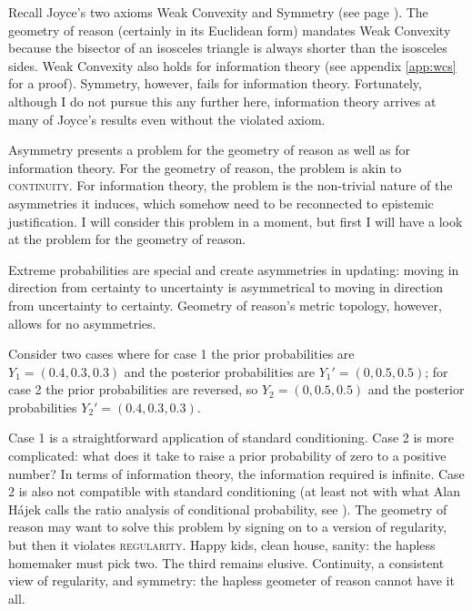 \documentclass[11pt]{article}
\begin{document}
Recall Joyce's two axioms Weak Convexity and Symmetry (see page
\pageref{quot:weakconv}). The geometry of reason (certainly in its
Euclidean form) mandates Weak Convexity because the bisector of an
isosceles triangle is always shorter than the isosceles sides. Weak
Convexity also holds for information theory (see appendix
\ref{app:wcs} for a proof). Symmetry, however, fails for information
theory. Fortunately, although I do not pursue this any further here,
information theory arrives at many of Joyce's results even without the
violated axiom.

Asymmetry presents a problem for the geometry of reason as well as for
information theory. For the geometry of reason, the problem is akin to
\textsc{continuity}. For information theory, the problem is the
non-trivial nature of the asymmetries it induces, which somehow need
to be reconnected to epistemic justification. I will consider this
problem in a moment, but first I will have a look at the problem for
the geometry of reason.

Extreme probabilities are special and create asymmetries in updating:
moving in direction from certainty to uncertainty is asymmetrical to
moving in direction from uncertainty to certainty. Geometry of
reason's metric topology, however, allows for no asymmetries.

\begin{quotex}
  \label{ex:extreme} Consider two cases
  where for case 1 the prior probabilities are $Y_{1}=(0.4,0.3,0.3)$
  and the posterior probabilities are $Y_{1}'=(0,0.5,0.5)$; for case 2
  the prior probabilities are reversed, so $Y_{2}=(0,0.5,0.5)$ and the
  posterior probabilities $Y_{2}'=(0.4,0.3,0.3)$.
\end{quotex}

Case 1 is a straightforward application of standard conditioning. Case
2 is more complicated: what does it take to raise a prior probability
of zero to a positive number? In terms of information theory, the
information required is infinite. Case 2 is also not compatible with
standard conditioning (at least not with what Alan H{\'a}jek calls the
ratio analysis of conditional probability, see ).
The geometry of reason may want to solve this problem by signing on to
a version of regularity, but then it violates \textsc{regularity}.
Happy kids, clean house, sanity: the hapless homemaker must pick two.
The third remains elusive. Continuity, a consistent view of
regularity, and symmetry: the hapless geometer of reason cannot have
it all.
\end{document}
